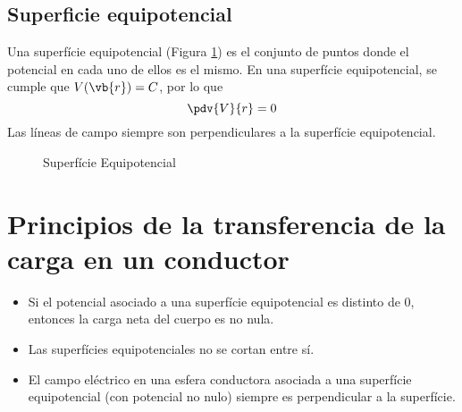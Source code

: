 \documentclass{./FisicaII.tex}
\begin{document}
\subsection{Superficie equipotencial}
Una superfície equipotencial (Figura \ref{fig:superficie-equipotencial}) es el conjunto de puntos donde el potencial en cada uno de ellos es el mismo. En una superfície equipotencial, se cumple que $V(\vb{r})=C$, por lo que
\[
	\pdv{V}{r}=0
\]
Las líneas de campo siempre son perpendiculares a la superfície equipotencial.
\begin{figure}[ht]
    \centering
    \caption{Superfície Equipotencial}
    \label{fig:superficie-equipotencial}
\end{figure}
\pagebreak
\section{Principios de la transferencia de la carga en un conductor}
\begin{itemize}
	\item Si el potencial asociado a una superfície equipotencial es distinto de $0$, entonces la carga neta del cuerpo es no nula.
	\item Las superfícies equipotenciales no se cortan entre sí.
	\item El campo eléctrico en una esfera conductora asociada a una superfície equipotencial (con potencial no nulo) siempre es perpendicular a la superfície.
\end{itemize}
\end{document}
